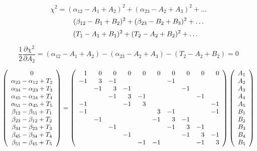 \documentclass[12pt]{article}
\begin{document}
\begin{equation}
\chi^2 = (\alpha_{12} - A_1 + A_2)^2 + (\alpha_{23} - A_2 + A_3)^2 + \ldots
\end{equation}
\begin{equation}
\mbox{\hspace{1.0 cm}} (\beta_{12} - B_1 + B_2)^2 + (\beta_{23} - B_2 + B_3)^2 + \ldots
\end{equation}
\begin{equation}
\mbox{\hspace{0.7 cm}} (T_1 - A_1 + B_1)^2 + (T_2 - A_2 + B_2)^2 + \ldots
\end{equation}

\begin{equation}
\frac{1}{2} \frac{\partial \chi^2}{\partial A_2} = (\alpha_{12} - A_1 + A_2) - (\alpha_{23} - A_2 + A_3) - (T_2 - A_2 + B_2) = 0
\end{equation}

\[ \left(\begin{array}{c} 0 \\
\alpha_{23} - \alpha_{12} + T_2 \\
\alpha_{34} - \alpha_{23} + T_3 \\
\alpha_{45} - \alpha_{34} + T_4 \\
\alpha_{51} - \alpha_{45} + T_5 \\
\beta_{12} - \beta_{51} + T_1 \\
\beta_{23} - \beta_{12} + T_2 \\
\beta_{34} - \beta_{23} + T_3 \\
\beta_{45} - \beta_{34} + T_4 \\
\beta_{51} - \beta_{45} + T_5 \\
\end{array}\right)
=
\left(\begin{array}{r r r r r r r r r r}
1 & 0 & 0 & 0 & 0 & 0 & 0 & 0 & 0 & 0 \\
-1 & 3 & -1 & & & & -1 & & & \\
& -1 & 3 & -1 & & & & -1 & & \\
& & -1 & 3 & -1 & & & & -1 & \\
-1 & & & -1 & 3 & & & & & -1 \\
-1 & & & & & 3 & -1 & & & -1 \\
& -1 & & & & -1 & 3 & -1 & & \\
& & -1 & & & & -1 & 3 & -1 & \\
& & & -1 & & & & -1 & 3 & -1 \\
& & & & -1 & -1 & & & -1 & 3 \\
\end{array}\right)
\left(\begin{array}{c} A_1 \\
A_2 \\
A_3 \\
A_4 \\
A_5 \\
B_1 \\
B_2 \\
B_3 \\
B_4 \\
B_5 \\
\end{array} \right) \]
\end{document}
